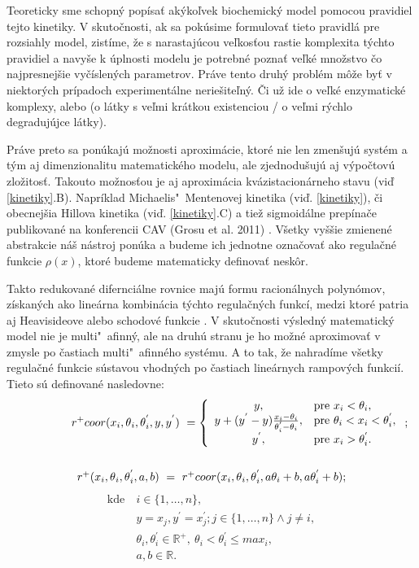 \documentclass[11pt,final,oneside]{fithesis}
\begin{document}
Teoreticky sme schopn\'y  pop\'isa\v t ak\' yko\v lvek biochemick\'y model pomocou pravidiel tejto kinetiky. V skuto\v cnosti, ak sa pok\'usime formulova\v t 
tieto pravidl\'a pre rozsiahly model, zist\'ime, \v ze s narastaj\'ucou ve\v lkos\v tou rastie komplexita t\'ychto pravidiel a navy\v se k \'uplnosti modelu
je potrebn\'e pozna\v t ve\v lk\'e mno\v zstvo \v co najpresnej\v sie vy\v c\'islen\'ych parametrov. Pr\'ave tento druh\'y probl\'em m\^ o\v ze by\v t 
v niektor\'ych pr\'ipadoch experiment\'alne nerie\v site\v ln\'y. \v Ci u\v z ide o ve\v lk\'e enzymatick\'e komplexy, alebo (o l\'atky s ve\v lmi 
kr\'atkou existenciou / o ve\v lmi r\'ychlo degraduj\'ujce l\'atky).

Pr\'ave preto sa pon\'ukaj\'u mo\v znosti aproxim\'acie, ktor\'e nie len zmen\v suj\'u syst\'em a t\'ym aj dimenzionalitu matematick\'eho modelu, 
ale zjednodu\v suj\'u aj v\'ypo\v ctov\'u zlo\v zitos\v t. Takouto mo\v znos\v tou je aj aproxim\'acia kv\'azistacion\'arneho stavu (vi\v d \ref{kinetiky}.B). 
Napr\'iklad Michaelis"~Mentenovej kinetika (vi\v d. \ref{kinetiky}), 
\v ci obecnej\v sia Hillova kinetika (vi\v d. \ref{kinetiky}.C) a tie\v z sigmoid\'alne prep\'ina\v ce publikovan\'e na konferencii CAV (Grosu et al. 2011)
\cite{CAV-2011}. 
V\v setky vy\v s\v sie zmienen\'e abstrakcie n\'a\v s n\'astroj pon\'uka a budeme ich jednotne ozna\v cova\v t ako regula\v cn\'e funkcie $\rho(x)$, ktor\'e
budeme matematicky definova\v t nesk\^ or. 

Takto redukovan\' e difernci\'alne rovnice maj\'u formu 
racion\'alnych polyn\'omov, z\'iskan\'ych ako line\'arna kombin\'acia t\'ychto regula\v cn\'ych funkc\'i, 
medzi ktor\'e patria aj Heavisideove alebo schodov\'e funkcie \cite{step}. 
V skuto\v cnosti v\'ysledn\'y 
matematick\'y model nie je multi"~afinn\'y, ale na druh\'u stranu je ho mo\v zn\'e aproximova\v t v zmysle po \v castiach mul\-ti"~afin\-n\'eho syst\'emu. 
A to tak, \v ze nahrad\'ime v\v setky regula\v cn\'e funkcie s\'ustavou vhodn\'ych po \v castiach line\'arnych rampov\'ych funkci\'i. Tieto s\'u definovan\'e 
nasledovne:
\begin{align*}
	r^+coor (x_i,\theta{}_i,\theta{}_i^{'},y,y^{'}) \ = \left\{ \begin{array}{cl}
y, & \textrm{pre} \ x_i < \theta_i,\\
y + (y^{'} - y)\frac{x_i - \theta_i}{\theta_i^{'} - \theta_i}, & \textrm{pre} \ \theta_i < x_i < \theta_i^{'},\\
y^{'}, & \textrm{pre} \ x_i > \theta_i^{'}.
	\end{array}
	\right.;
	\\
	\\
	\centerline{$r^+ (x_i, \theta{}_i, \theta{}_i^{'}, a,b) \ = \ r^+coor (x_i,\theta{}_i,\theta{}_i^{'},a\theta_i + b,a\*\theta_i^{'} + b)$;}
\end{align*}
\begin{align*}
	\textrm{kde} \ &i \in \{1,\dots{},n\},\\
	&y = x_j, y^{'} = x_j^{'}; j \in \{1,\dots{},n\} \wedge j \neq i,\\
	&\theta_i, \theta_i^{'} \in \mathbb{R}^+, \ \theta_i < \theta_i^{'} \leq max_i,\\
	&a, b \in \mathbb{R}.
\end{align*}
\end{document}
